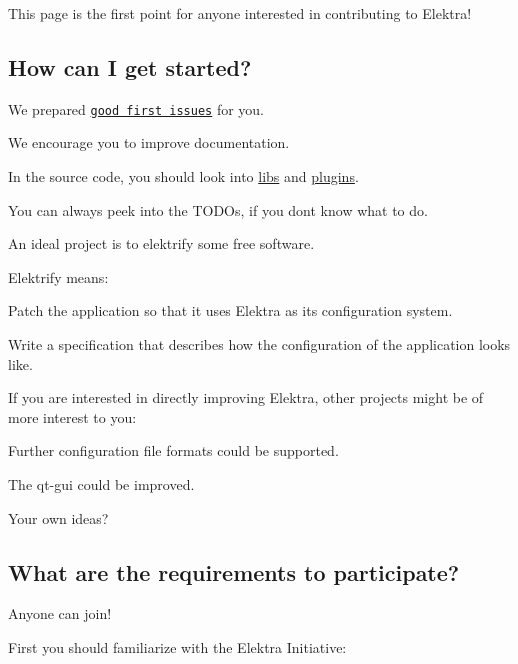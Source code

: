 This page is the first point for anyone interested in contributing to Elektra!

\subsection*{How can I get started?}

We prepared \href{https://github.com/ElektraInitiative/libelektra/issues?q=is%3Aissue+is%3Aopen+label%3A%22good+first+issue%22}{\tt good first issues} for you.


\begin{DoxyItemize}
\item We encourage you to improve documentation.
\item In the source code, you should look into \hyperlink{md_src_libs_README_src_libs_README_md}{libs} and \hyperlink{md_src_plugins_README_src_plugins_README_md}{plugins}.
\item You can always peek into the T\+O\+D\+Os, if you don\textquotesingle{}t know what to do.
\item An ideal project is to elektrify some free software.
\end{DoxyItemize}

Elektrify means\+:


\begin{DoxyItemize}
\item Patch the application so that it uses Elektra as its configuration system.
\item Write a specification that describes how the configuration of the application looks like.
\end{DoxyItemize}

If you are interested in directly improving Elektra, other projects might be of more interest to you\+:


\begin{DoxyItemize}
\item Further configuration file formats could be supported.
\item The qt-\/gui could be improved.
\item Your own ideas?
\end{DoxyItemize}

\subsection*{What are the requirements to participate?}

Anyone can join!

First you should familiarize with the Elektra Initiative\+:


